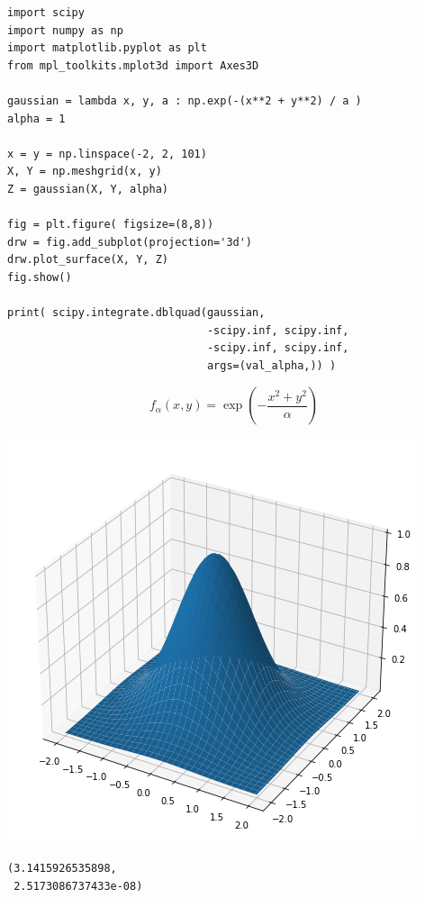 \begin{frame}[fragile]
%
\begin{minipage}[b]{.7\linewidth}
\begin{codebox}%
\begin{verbatim}
import scipy
import numpy as np
import matplotlib.pyplot as plt
from mpl_toolkits.mplot3d import Axes3D

gaussian = lambda x, y, a : np.exp(-(x**2 + y**2) / a )
alpha = 1

x = y = np.linspace(-2, 2, 101)
X, Y = np.meshgrid(x, y)
Z = gaussian(X, Y, alpha)

fig = plt.figure( figsize=(8,8))
drw = fig.add_subplot(projection='3d')
drw.plot_surface(X, Y, Z)
fig.show()

print( scipy.integrate.dblquad(gaussian,
                               -scipy.inf, scipy.inf,
                               -scipy.inf, scipy.inf,
                               args=(val_alpha,)) )
\end{verbatim}
\end{codebox}
\end{minipage}
%
\begin{minipage}[b]{.29\linewidth}
\[
	f_\alpha(x, y)
=
	\exp( -\frac
	{x^2 + y^2}
	{\alpha} )
\]
%
\begin{tcolorbox}[title=Output]%
	\includegraphics[width=\linewidth]{./gfx/gaussian-2D}
\end{tcolorbox}
%
\begin{cmdbox}[Output]%
\begin{verbatim}
(3.1415926535898,
 2.5173086737433e-08)
\end{verbatim}
\end{cmdbox}
\end{minipage}
%
\end{frame}

